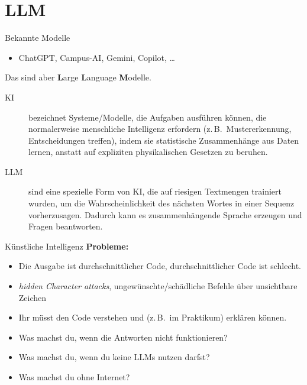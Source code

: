 \section{LLM}


\begin{frame}{Bekannte Modelle}
    \begin{itemize}
        \item ChatGPT, Campus-AI, Gemini, Copilot, \dots
    \end{itemize}
    Das sind aber \textbf{L}arge \textbf{L}anguage \textbf{M}odelle.
    \begin{description}
        \item[KI] bezeichnet Systeme/Modelle, die Aufgaben ausführen können,
            die normalerweise menschliche Intelligenz erfordern
            (z.\,B.\ Mustererkennung, Entscheidungen treffen),
            indem sie statistische Zusammenhänge aus Daten lernen,
            anstatt auf expliziten physikalischen Gesetzen zu beruhen. 
        \item[LLM] sind eine spezielle Form von KI, die auf riesigen Textmengen trainiert wurden,
            um die Wahrscheinlichkeit des nächsten Wortes in einer Sequenz vorherzusagen.
            Dadurch kann es zusammenhängende Sprache erzeugen und Fragen beantworten.
    \end{description}
\end{frame}

\begin{frame}{Künstliche Intelligenz}
    \textcolor{vertexDarkRed}{\textbf{Probleme:}}
    \begin{itemize}
        \item Die Ausgabe ist durchschnittlicher Code, durchschnittlicher Code ist schlecht.
        \item \textit{hidden Character attacks}, ungewünschte/schädliche Befehle über unsichtbare Zeichen
        \item Ihr müsst den Code verstehen und (z.\,B.\ im Praktikum) erklären können.
        \item Was machst du, wenn die Antworten nicht funktionieren?
        \item Was machst du, wenn du keine LLMs nutzen darfst?
        \item Was machst du ohne Internet?
    \end{itemize}
\end{frame}